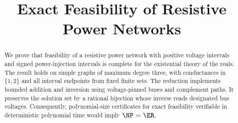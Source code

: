 \documentclass[11pt]{article}
\title{Exact Feasibility of Resistive Power Networks}
\author{}
\date{}
\begin{document}
\maketitle
\begin{abstract}
We prove that feasibility of a resistive power network with positive voltage
intervals and signed power-injection intervals is complete for the existential
theory of the reals. The result holds on simple graphs of maximum degree three,
with conductances in $\{1,2\}$ and all interval endpoints from fixed finite sets.
The reduction implements bounded addition and inversion using voltage-pinned
buses and complement paths. It preserves the solution set by a rational
bijection whose inverse reads designated bus voltages. Consequently, polynomial-size
certificates for exact feasibility verifiable in deterministic polynomial time
would imply $\NP=\ER$.
\end{abstract}




\end{document}
